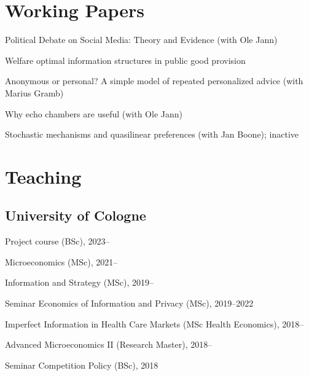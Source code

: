\documentclass[a4paper]{article}
\renewenvironment{itemize}{
  \begin{list}{}{
    \setlength{\leftmargin}{1.5em}
  }
}{
  \end{list}
}
\begin{document}
\section*{Working Papers}

\begin{itemize}
\item Political Debate on Social Media: Theory and Evidence (with Ole Jann)
  
\item Welfare optimal information structures in public good provision
  
\item Anonymous or personal? A simple model of repeated personalized advice (with Marius Gramb)
  
\item Why echo chambers are useful (with Ole Jann)
  
\item Stochastic mechanisms and quasilinear preferences (with Jan Boone); inactive

\end{itemize}




\section*{Teaching} 

\subsection*{University of Cologne}
\begin{itemize}
\item Project course (BSc), 2023--  
\item Microeconomics (MSc), 2021--
\item Information and Strategy (MSc), 2019--
\item Seminar Economics of Information and Privacy (MSc), 2019--2022
\item Imperfect Information in Health Care Markets (MSc Health Economics), 2018--
\item Advanced Microeconomics II (Research Master), 2018--
\item Seminar Competition Policy (BSc), 2018
\end{itemize}
\end{document}
